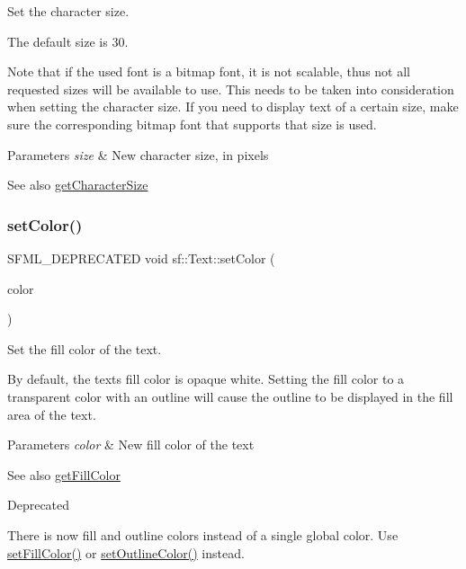 Set the character size. 

The default size is 30.

Note that if the used font is a bitmap font, it is not scalable, thus not all requested sizes will be available to use. This needs to be taken into consideration when setting the character size. If you need to display text of a certain size, make sure the corresponding bitmap font that supports that size is used.


\begin{DoxyParams}{Parameters}
{\em size} & New character size, in pixels\\
\hline
\end{DoxyParams}
\begin{DoxySeeAlso}{See also}
\hyperlink{classsf_1_1_text_a46d1d7f1d513bb8d434e985a93ea5224}{get\+Character\+Size} 
\end{DoxySeeAlso}
\mbox{\label{classsf_1_1_text_a6ce65272d6d63ed01118366e92c68132}} 
\subsubsection{\texorpdfstring{set\+Color()}{setColor()}}
{\footnotesize\ttfamily S\+F\+M\+L\+\_\+\+D\+E\+P\+R\+E\+C\+A\+T\+ED void sf\+::\+Text\+::set\+Color (\begin{DoxyParamCaption}\item[{const \hyperlink{classsf_1_1_color}{Color} \&}]{color }\end{DoxyParamCaption})}



Set the fill color of the text. 

By default, the text\textquotesingle{}s fill color is opaque white. Setting the fill color to a transparent color with an outline will cause the outline to be displayed in the fill area of the text.


\begin{DoxyParams}{Parameters}
{\em color} & New fill color of the text\\
\hline
\end{DoxyParams}
\begin{DoxySeeAlso}{See also}
\hyperlink{classsf_1_1_text_a6b4ba8c435b59e1e05f831e6230dc537}{get\+Fill\+Color}
\end{DoxySeeAlso}
\begin{DoxyRefDesc}{Deprecated}
\item[\hyperlink{deprecated__deprecated000017}{Deprecated}]There is now fill and outline colors instead of a single global color. Use \hyperlink{classsf_1_1_text_ab7bb3babac5a6da1802b2c3e1a3e6dcc}{set\+Fill\+Color()} or \hyperlink{classsf_1_1_text_aa19ec69c3b894e963602a6804ca68fe4}{set\+Outline\+Color()} instead.\end{DoxyRefDesc}
\mbox{\label{classsf_1_1_text_ab7bb3babac5a6da1802b2c3e1a3e6dcc}} 
